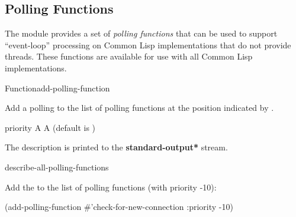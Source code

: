 \documentclass[10pt,twoside,english,pdftex]{article}
\begin{document}
\subsection{Polling Functions}
\label{sec:pollingfunctions}%

%
%
The  module provides a set of \textit{polling
  functions\/} that can be used to support ``event-loop'' processing on Common
Lisp implementations that do not provide threads.  These functions are
available for use with all Common Lisp implementations.

\W\entities
\T\clearpage


\begin{functiondoc}{Function}{add-polling-function}%
  {  }
%

\fnsyntax 

\fnpurpose Add a polling  to the list of polling functions at the
position indicated by .

\fnpackage {}

\fnmodule {}

\fnargs
\begin{args}{priority}
\arg[function] A 
\arg[priority] A  (default is )
\end{args}

\fndescription
{}%
The description is printed to the {\bf *standard-output*} stream.

\begin{alsos}{describe-all-polling-functions}
\end{alsos}

\fnexample
Add the   to the list of polling 
functions (with priority -10):
\begin{example}
  (add-polling-function #'check-for-new-connection
     :priority -10)
\end{example}

\end{functiondoc}
\end{document}
